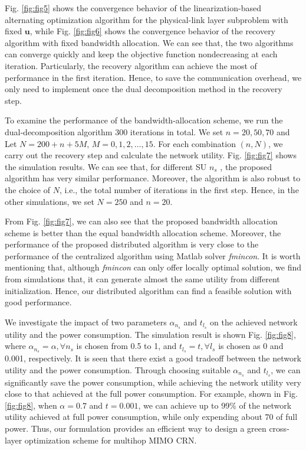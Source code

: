 \documentclass[12pt,onecolumn,tworows]{IEEEtran}
\begin{document}
Fig. \ref{fig:fig5} shows the convergence behavior of the linearization-based alternating optimization algorithm for the physical-link layer subproblem with fixed $\mathbf{u}$, while Fig. \ref{fig:fig6} shows the convergence behavior of the recovery algorithm with fixed bandwidth allocation. We can see that, the two algorithms can converge quickly and keep the objective function nondecreasing at each iteration. Particularly, the recovery algorithm can achieve the most of performance in the first iteration. Hence, to save the communication overhead, we only need to implement once the dual decomposition method in the recovery step.

To examine the performance of the bandwidth-allocation scheme, we run the dual-decomposition algorithm 300 iterations in total. We set $n=20,50,70$ and Let $N= 200+n+5M$, $M=0,1,2,\ldots,15$. For each combination $(n, N)$, we carry out the recovery step and calculate the network utility. Fig. \ref{fig:fig7} shows the simulation results. We can see that, for different SU $n_s$ , the proposed algorithm has very similar performance. Moreover, the algorithm is also robust to the choice of $N$, i.e., the total number of iterations in the first step. Hence, in the other simulations, we set $N=250$ and $n=20$.

From Fig. \ref{fig:fig7}, we can also see that the proposed bandwidth allocation scheme is better than the equal bandwidth allocation scheme. Moreover, the performance of the proposed distributed algorithm is very close to the performance of the centralized algorithm using Matlab solver \emph{fmincon}. It is worth mentioning that, although \emph{fmincon} can only offer locally optimal solution, we find from simulations that, it can generate almost the same utility from different initialization. Hence, our distributed algorithm can find a feasible solution with good performance.

We investigate the impact of two parameters $\alpha_{n_s}$ and $t_{l_s}$ on the achieved network utility and the power consumption. The simulation result is shown Fig. \ref{fig:fig8}, where $\alpha_{n_s}=\alpha, \forall n_s$ is chosen from 0.5 to 1, and $t_{l_s}=t, \forall l_s$  is chosen as 0 and 0.001, respectively. It is seen that there exist a good tradeoff between the network utility and the power consumption. Through choosing suitable $\alpha_{n_s}$ and $t_{l_s}$, we can significantly save the power consumption, while achieving the network utility very close to that achieved at the full power consumption. For example, shown in Fig. \ref{fig:fig8}, when $\alpha=0.7$ and $t=0.001$,
we can achieve up to 99\% of the network utility achieved at full power consumption, while only expending about $70$ of full power. Thus, our formulation provides an efficient way to design a green cross-layer optimization scheme for multihop MIMO CRN.
\end{document}
